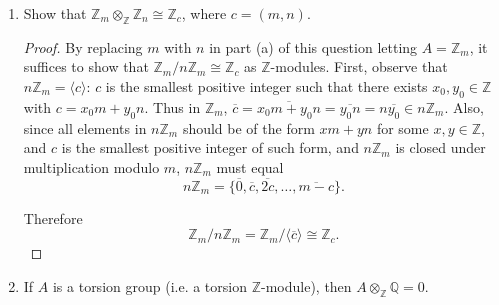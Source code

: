 \documentclass{article}
\begin{document}
\begin{enumerate}[label={(\alph*)}]
\begin{proof}
        Now by $\mathbb{Z}$-bilinear property of tensors, given arbitrary
        $a\in A$ and $z\in\mathbb{Z}_m$,
        \begin{align*}
          &\;(z\cdot a)\otimes\bar{1}\\
          =&\;a\otimes(z\cdot\bar{1})\\
          =&\;a\otimes\bar{z},\\
        \end{align*}
        thus we can simplify the above conditions to get
        \[\sum_{i=1}^n a_i\otimes\overline{z_i} =b\otimes\overline{m}=0,\]
        which implies $x=0$. Thus $\ker(\Phi)=0$.
      \end{proof}

    \item Show that $\mathbb{Z}_m\otimes_\mathbb{Z}\mathbb{Z}_n
      \cong\mathbb{Z}_c$, where $c=(m,n)$.
      \begin{proof}
        By replacing $m$ with $n$ in part (a) of this question letting
        $A=\mathbb{Z}_m$, it suffices to show that
        $\mathbb{Z}_m/n\mathbb{Z}_m\cong \mathbb{Z}_c$ as
        $\mathbb{Z}$-modules. First, observe that $n\mathbb{Z}_m=\langle
        c\rangle$: $c$ is the smallest positive integer such that there
        exists $x_0,y_0\in\mathbb{Z}$ with $c=x_0m+y_0n$. Thus in
        $\mathbb{Z}_m$,
        $\overline{c}=\overline{x_0m+y_0n}=\overline{y_0n}=n\overline{y_0}
        \in n\mathbb{Z}_m$. Also, since all elements in $n\mathbb{Z}_m$
        should be of the form $xm+yn$ for some $x,y\in\mathbb{Z}$, and $c$
        is the smallest positive integer of such form, and $n\mathbb{Z}_m$
        is closed under multiplication modulo $m$, $n\mathbb{Z}_m$ must
        equal
        \[n\mathbb{Z}_m =\{\overline{0}, \overline{c},
        \overline{2c}, \ldots, \overline{m-c}\}.\]

        Therefore
        \[\mathbb{Z}_m/n\mathbb{Z}_m
        =\mathbb{Z}_m/\langle\overline{c}\rangle
        \cong\mathbb{Z}_c.\]
      \end{proof}

    \item If $A$ is a torsion group (i.e. a torsion $\mathbb{Z}$-module),
      then $A\otimes_\mathbb{Z}\mathbb{Q}=0$.


\end{enumerate}
\end{document}
